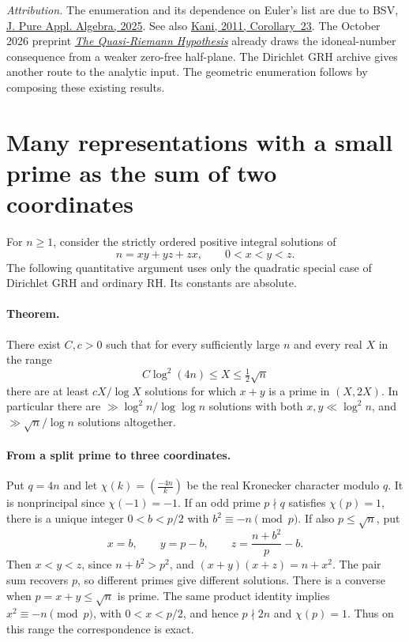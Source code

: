 \documentclass[11pt]{article}
\begin{document}
\emph{Attribution.} The enumeration and its dependence on Euler's list are due
to BSV, \href{https://doi.org/10.1016/j.jpaa.2025.107974}{J. Pure Appl. Algebra,
2025}. See also \href{https://mast.queensu.ca/~kani/papers/2011K1.pdf}{Kani,
2011, Corollary~23}. The October 2026 preprint
\href{https://github.com/openai/math/tree/main/preprints/The-Quasi-Riemann-Hypothesis-October-5-2026}{\emph{The Quasi-Riemann Hypothesis}}
already draws the idoneal-number consequence from a weaker zero-free
half-plane. The Dirichlet GRH archive gives another route to the analytic
input. The geometric enumeration follows by composing these existing results.



\section{Many representations with a small prime as the sum of two coordinates}

For $n\ge 1$, consider the strictly ordered positive integral solutions of
\[
                  n=xy+yz+zx,\qquad 0<x<y<z .
\]
The following quantitative argument uses only the quadratic special case of
Dirichlet GRH and ordinary RH. Its constants are absolute.

\paragraph{Theorem.}
There exist $C,c>0$ such that for every sufficiently large $n$ and every real
$X$ in the range
\[
             C\log^2(4n)\le X\le \tfrac12\sqrt n
\]
there are at least $cX/\log X$ solutions for which $x+y$ is a prime in
$(X,2X)$. In particular there are $\gg \log^2 n/\log\log n$ solutions
with both $x,y\ll\log^2 n$, and $\gg \sqrt n/\log n$ solutions altogether.

\paragraph{From a split prime to three coordinates.}
Put $q=4n$ and let $\chi(k)=(\frac{-4n}{k})$ be the real Kronecker character
modulo $q$. It is nonprincipal since $\chi(-1)=-1$. If an odd prime
$p\nmid q$ satisfies $\chi(p)=1$, there is a unique integer
$0<b<p/2$ with $b^2\equiv -n\pmod p$.
If also $p\le\sqrt n$, put
\[
 x=b,\qquad y=p-b,\qquad z=\frac{n+b^2}{p}-b.
\]
Then $x<y<z$, since $n+b^2>p^2$, and $(x+y)(x+z)=n+x^2$.
The pair sum recovers $p$, so different primes give different solutions.
There is a converse when $p=x+y\le\sqrt n$ is prime. The same product identity
implies $x^2\equiv -n\pmod p$, with $0<x<p/2$, and hence $p\nmid 2n$
and $\chi(p)=1$. Thus on this range the correspondence is exact.
\end{document}
